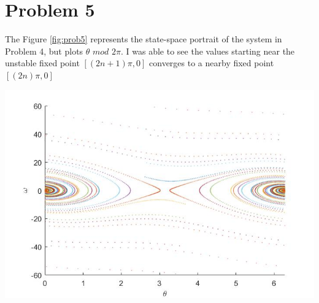 \documentclass{article}
\begin{document}
\section*{Problem 5}
The Figure \ref{fig:prob5} represents the state-space portrait of the system in Problem 4, but plots $\theta\,\, mod\,\, 2\pi$. I was able to see the values starting near the unstable fixed point $[(2n+1)\pi,0]$ converges to a nearby fixed point $[(2n)\pi,0]$ \par\bigskip
\begin{minipage}{\linewidth}
{
\centering 
\includegraphics[scale=0.4]{images/prob5.jpg}
\label{fig:prob5}
}
\end{minipage}
\end{document}
